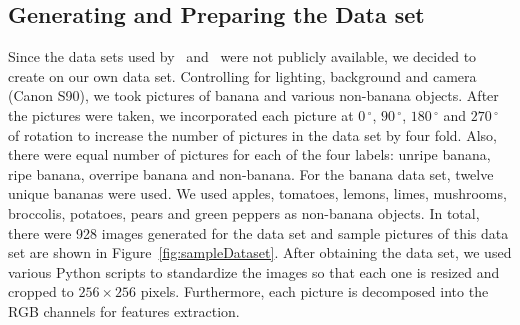 \documentclass{article} %
\begin{document}
\subsection{Generating and Preparing the Data set}

Since the data sets used by~\citet{saad2009recognizing} and~\citet{paulraj2009color} were not publicly available, we decided to create on our own data set. Controlling for lighting, background and camera (Canon S90), we took pictures of banana and various non-banana objects. After the pictures were taken, we incorporated each picture at $0\,^{\circ}$, $90\,^{\circ}$, $180\,^{\circ}$ and  $270\,^{\circ}$ of rotation to increase the number of pictures in the data set by four fold. Also, there were equal number of pictures for each of the four labels: unripe banana, ripe banana, overripe banana and non-banana. For the banana data set, twelve unique bananas were used. We used apples, tomatoes, lemons, limes, mushrooms, broccolis, potatoes, pears and green peppers as non-banana objects. In total, there were 928 images generated for the data set and sample pictures of this data set are shown in Figure~\ref{fig:sampleDataset}. After obtaining the data set, we used various Python scripts to standardize the images so that each one is resized and cropped to $256\times 256$ pixels. Furthermore, each picture is decomposed into the RGB channels for features extraction. 
\end{document}
